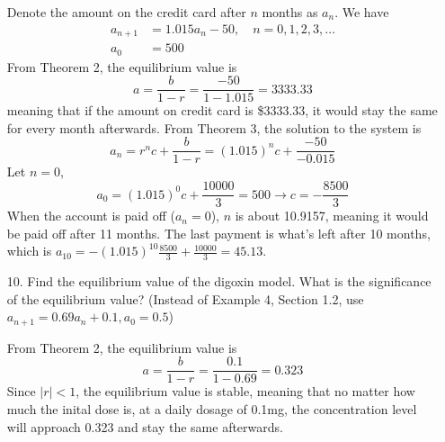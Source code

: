 \documentclass[10pt]{report}
\newcommand{\abs}[1] {\left| #1 \right|}
\begin{document}
\begin{enumerate}
	Denote the amount on the credit card after $n$ months as $a_n$. We have
	\begin{align*}
		a_{n+1} &= 1.015 a_n - 50, \quad n=0,1,2,3,\dots\\
		a_0 &= 500
	\end{align*}
	From Theorem 2, the equilibrium value is
	\[
	a = \frac{b}{1-r} = \frac{-50}{1-1.015} = 3333.33
	\]
	meaning that if the amount on credit card is \$3333.33, it would stay the same for every month afterwards. From Theorem 3, the solution to the system is
	\[
	a_n = r^n c + \frac{b}{1-r} = (1.015)^n c + \frac{-50}{-0.015}
	\]
	Let $n = 0$,
	\[
	a_0 = (1.015)^0 c + \frac{10000}{3} = 500 \to c = -\frac{8500}{3}
	\]
	When the account is paid off ($a_n = 0$), $n$ is about 10.9157, meaning it would be paid off after 11 months. The last payment is what's left after 10 months, which is $a_{10} = -(1.015)^{10} \frac{8500}{3} + \frac{10000}{3} = 45.13$.
	
	\item [10.]
	Find the equilibrium value of the digoxin model. What is the significance of the equilibrium value? (Instead of Example 4, Section 1.2, use $a_{n+1} = 0.69 a_n + 0.1, a_0=0.5$)
	
	From Theorem 2, the equilibrium value is
	\[
	a = \frac{b}{1-r} = \frac{0.1}{1-0.69} = 0.323
	\]
	Since $\abs{r} < 1$, the equilibrium value is stable, meaning that no matter how much the inital dose is, at a daily dosage of 0.1mg, the concentration level will approach 0.323 and stay the same afterwards.
\end{enumerate}
\end{document}
